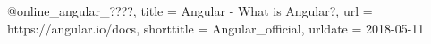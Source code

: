 @online{_angular_????,
	title = {Angular - What is Angular?},
	url = {https://angular.io/docs},
	shorttitle = {Angular\_official},
	urldate = {2018-05-11}
}
